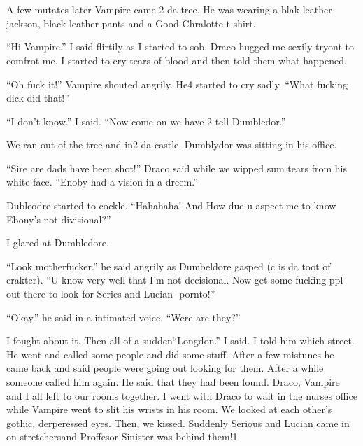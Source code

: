 \section{\chaptername~\thesection}



A few mutates later Vampire came 2 da tree. He was wearing a blak leather jackson, black leather pants and a Good Chralotte t-shirt.

\enquote{Hi Vampire.} I said flirtily as I started to sob. Draco hugged me sexily tryont to comfrot me. I started to cry tears of blood and then told them what happened.

\enquote{Oh fuck it!} Vampire shouted angrily. He4 started to cry sadly. \enquote{What fucking dick did that!}

\enquote{I don't know.} I said. \enquote{Now come on we have 2 tell Dumbledor.}

We ran out of the tree and in2 da castle. Dumblydor was sitting in his office.

\enquote{Sire are dads have been shot!} Draco said while we wipped sum tears from his white face. \enquote{Enoby had a vision in a dreem.}

Dubleodre started to cockle. \enquote{Hahahaha! And How due u aspect me to know Ebony's not divisional?}

I glared at Dumbledore.

\enquote{Look motherfucker.} he said angrily as Dumbeldore gasped (c is da toot of crakter). \enquote{U know very well that I'm not decisional. Now get some fucking ppl out there to look for Series and Lucian- pornto!}

\enquote{Okay.} he said in a intimated voice. \enquote{Were are they?}

I fought about it. Then all of a sudden\dotfill \enquote{Longdon.} I said. I told him which street. He went and called some people and did some stuff. After a few mistunes he came back and said people were going out looking for them. After a while someone called him again. He said that they had been found. Draco, Vampire and I all left to our rooms together. I went with Draco to wait in the nurses office while Vampire went to slit his wrists in his room. We looked at each other's gothic, derperessed eyes. Then, we kissed. Suddenly Serious and Lucian came in on stretchers\dotfill\newline\phantom{}\dotfill and Proffesor Sinister was behind them!1

